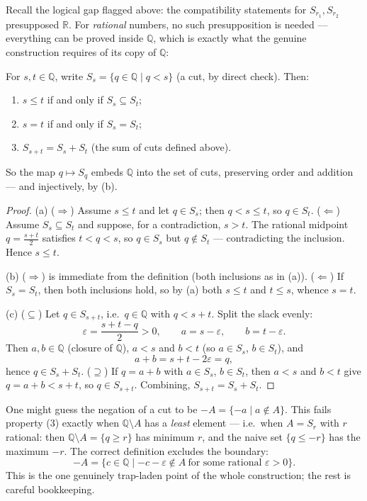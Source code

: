 \documentclass[11pt]{report}
\begin{document}
Recall the logical gap flagged above: the compatibility statements for $S_{r_1}, S_{r_2}$ presupposed $\mathbb{R}$. For \emph{rational} numbers, no such presupposition is needed --- everything can be proved inside $\mathbb{Q}$, which is exactly what the genuine construction requires of its copy of $\mathbb{Q}$:

\begin{propbox}
For $s, t \in \mathbb{Q}$, write $S_s = \{q \in \mathbb{Q} \mid q < s\}$ (a cut, by direct check). Then:
\begin{enumerate}[label=(\alph*)]
    \item $s \leq t$ if and only if $S_s \subseteq S_t$;
    \item $s = t$ if and only if $S_s = S_t$;
    \item $S_{s+t} = S_s + S_t$ (the sum of cuts defined above).
\end{enumerate}
So the map $q \mapsto S_q$ embeds $\mathbb{Q}$ into the set of cuts, preserving order and addition --- and injectively, by (b).
\end{propbox}

\begin{proof}
(a) ($\Rightarrow$) Assume $s \leq t$ and let $q \in S_s$; then $q < s \leq t$, so $q \in S_t$. ($\Leftarrow$) Assume $S_s \subseteq S_t$ and suppose, for a contradiction, $s > t$. The rational midpoint $q = \tfrac{s+t}{2}$ satisfies $t < q < s$, so $q \in S_s$ but $q \notin S_t$ --- contradicting the inclusion. Hence $s \leq t$.

(b) ($\Rightarrow$) is immediate from the definition (both inclusions as in (a)). ($\Leftarrow$) If $S_s = S_t$, then both inclusions hold, so by (a) both $s \leq t$ and $t \leq s$, whence $s = t$.

(c) ($\subseteq$) Let $q \in S_{s+t}$, i.e.\ $q \in \mathbb{Q}$ with $q < s + t$. Split the slack evenly:
\[
\varepsilon = \frac{s + t - q}{2} > 0, \qquad a = s - \varepsilon, \qquad b = t - \varepsilon.
\]
Then $a, b \in \mathbb{Q}$ (closure of $\mathbb{Q}$), $a < s$ and $b < t$ (so $a \in S_s$, $b \in S_t$), and
\[
a + b = s + t - 2\varepsilon = q,
\]
hence $q \in S_s + S_t$. ($\supseteq$) If $q = a + b$ with $a \in S_s$, $b \in S_t$, then $a < s$ and $b < t$ give $q = a + b < s + t$, so $q \in S_{s+t}$. Combining, $S_{s+t} = S_s + S_t$.
\end{proof}

\begin{rembox}
One might guess the negation of a cut to be $-A = \{-a \mid a \notin A\}$. This fails property (3) exactly when $\mathbb{Q} \setminus A$ has a \emph{least} element --- i.e.\ when $A = S_r$ with $r$ rational: then $\mathbb{Q}\setminus A = \{q \geq r\}$ has minimum $r$, and the naive set $\{q \leq -r\}$ has the maximum $-r$. The correct definition excludes the boundary:
\[
-A = \{ c \in \mathbb{Q} \mid -c - \varepsilon \notin A \ \text{for some rational } \varepsilon > 0 \}.
\]
This is the one genuinely trap-laden point of the whole construction; the rest is careful bookkeeping.
\end{rembox}
\end{document}
